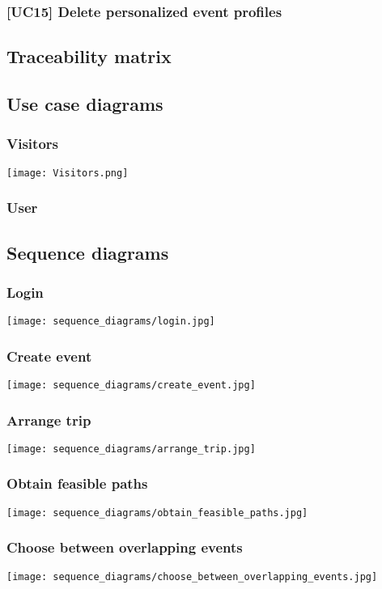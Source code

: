 	\subsubsection{[UC15] Delete personalized event profiles}
		
		
\subsection{Traceability matrix}
\label{subsect: Traceability matrix}
	

\subsection{Use case diagrams}
\label{subsect:Use case diagrams}
	\subsubsection{Visitors}
		\texttt{[image: Visitors.png]}
	\subsubsection{User}
		\noindent{}
		
\subsection{Sequence diagrams}
\label{subsect:Sequence diagrams}
	\subsubsection{Login}
		\texttt{[image: sequence\_diagrams/login.jpg]}
	\subsubsection{Create event}
		\texttt{[image: sequence\_diagrams/create\_event.jpg]}
	\subsubsection{Arrange trip}
		\texttt{[image: sequence\_diagrams/arrange\_trip.jpg]}
	\subsubsection{Obtain feasible paths}
		\texttt{[image: sequence\_diagrams/obtain\_feasible\_paths.jpg]}
	\subsubsection{Choose between overlapping events}
		\texttt{[image: sequence\_diagrams/choose\_between\_overlapping\_events.jpg]}